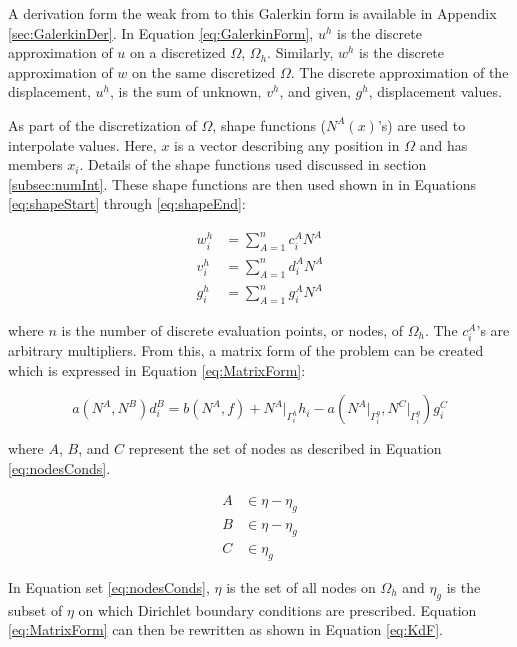 \documentclass[a4paper, 12pt]{article}
\begin{document}
\noindent
A derivation form the weak from to this Galerkin form
is available in Appendix \ref{sec:GalerkinDer}.
In Equation \ref{eq:GalerkinForm}, $u^{h}$ is the discrete
approximation of $u$ on a discretized $\Omega$, $\Omega_h$. Similarly,
$w^{h}$ is the discrete approximation of $w$ on the same
discretized $\Omega$. The discrete approximation of
the displacement, $u^{h}$, is the sum of unknown, $v^{h}$,
and given, $g^{h}$, displacement values.

As part of the discretization of $\Omega$, shape functions
($N^{A}(x)$'s) are used to interpolate values. Here, $x$
is a vector describing any position in $\Omega$ and has members $x_i$.
Details of the shape functions used discussed in section \ref{subsec:numInt}.
These shape functions are then used shown in in Equations
\ref{eq:shapeStart} through \ref{eq:shapeEnd}:

\begin{align}
w^{h}_i &= \sum_{A=1}^{n} c^{A}_i N^{A}
  \label{eq:shapeStart}                       \\
v^{h}_i &= \sum_{A=1}^{n} d^{A}_i N^{A}
  \label{eq:shapeUnks}                         \\
g^{h}_i &= \sum_{A=1}^{n} g^{A}_i N^{A}
  \label{eq:shapeEnd}
\end{align}

\noindent
where $n$ is the number of discrete evaluation points, or nodes,
of $\Omega_h$. The $c^{A}_{i}$'s are arbitrary multipliers. From this, a matrix
form of the problem can be created which is expressed in
Equation \ref{eq:MatrixForm}:

\begin{equation} \label{eq:MatrixForm}
a( N^A, N^B) d^{B}_{i} =
  b( N^A, f) +
  N^A\Big|_{\Gamma_{i}^{h}} h_i -
  a( N^A\Big|_{\Gamma_{i}^{g}} , N^C\Big|_{\Gamma_{i}^{g}} ) g_{i}^C
\end{equation}

\noindent
where $A$, $B$, and $C$ represent the set of nodes as described in
Equation \ref{eq:nodesConds}.

\begin{align}
A &\in \eta - \eta_g
  \nonumber         \\
B &\in \eta - \eta_g
  \nonumber         \\
C &\in \eta_g
  \label{eq:nodesConds}
\end{align}

\noindent
In Equation set \ref{eq:nodesConds}, $\eta$ is the set of all nodes on $\Omega_h$
and $\eta_g$ is the subset of $\eta$ on which Dirichlet boundary conditions are
prescribed. Equation \ref{eq:MatrixForm} can then be rewritten as shown in
Equation \ref{eq:KdF}.
\end{document}
